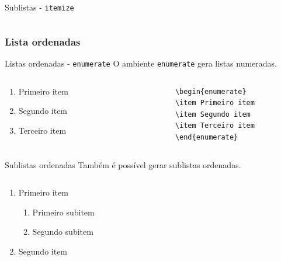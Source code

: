\documentclass[c]{beamer}
\begin{document}
{\begin{frame}[fragile]{\sc Sublistas - \texttt{itemize}}
\begin{columns}
	\end{columns}
	
\end{frame}

\subsubsection{Lista ordenadas}

\begin{frame}[fragile]{\sc Listas ordenadas - \texttt{enumerate}}
	O ambiente \texttt{enumerate} gera {\color{blue} listas numeradas}.	
	\begin{columns}
		\begin{column}[t]{0.5\textwidth}
			\begin{enumerate}
				\item Primeiro item
				\item Segundo item
				\item Terceiro item
			\end{enumerate}
		\end{column}
		\begin{column}[t]{0.5\textwidth}
			\begin{verbatim}
			\begin{enumerate}
			\item Primeiro item
			\item Segundo item
			\item Terceiro item
			\end{enumerate}
			\end{verbatim}
		\end{column}
		
	\end{columns}
	
\end{frame}

\begin{frame}[fragile]{\sc Sublistas ordenadas}
	Também é possível gerar {\color{blue} sublistas ordenadas}.
	
	\begin{columns}
		\begin{column}[t]{0.5\textwidth}
			\begin{enumerate}
				\item Primeiro item
				\begin{enumerate}
					\item Primeiro subitem
					\item Segundo subitem
				\end{enumerate}
				\item Segundo item
			\end{enumerate}
		\end{column}
		

\end{columns}
\end{frame}}
\end{document}
